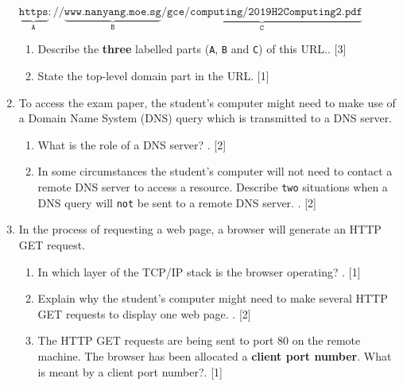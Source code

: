 \begin{enumerate}
$\mathtt{\underset{A}{\underbrace{https}}://\underset{B}{\underbrace{www.nanyang.moe.sg}}\underset{C}{\underbrace{/gce/computing/2019H2Computing2.pdf}}}$
\begin{enumerate}
\item Describe the \textbf{three} labelled parts (\texttt{A}, \texttt{B}
and \texttt{C}) of this URL.. \hfill{} {[}3{]}
\item State the top-level domain part in the URL. \hfill{} {[}1{]}
\end{enumerate}
\item To access the exam paper, the student\textquoteright s computer might
need to make use of a Domain Name System (DNS) query which is transmitted
to a DNS server.
\begin{enumerate}
\item What is the role of a DNS server? . \hfill{}{[}2{]}
\item In some circumstances the student\textquoteright s computer will not
need to contact a remote DNS server to access a resource. Describe
\texttt{two} situations when a DNS query will \texttt{not} be sent
to a remote DNS server. . \hfill{}{[}2{]}
\end{enumerate}
\item In the process of requesting a web page, a browser will generate an
HTTP GET request.
\begin{enumerate}
\item In which layer of the TCP/IP stack is the browser operating? . \hfill{}{[}1{]}
\item Explain why the student\textquoteright s computer might need to make
several HTTP GET requests to display one web page. . \hfill{}{[}2{]}
\item The HTTP GET requests are being sent to port 80 on the remote machine.
The browser has been allocated a \textbf{client port number}. What
is meant by a client port number?. \hfill{} {[}1{]}
\end{enumerate}
\end{enumerate}